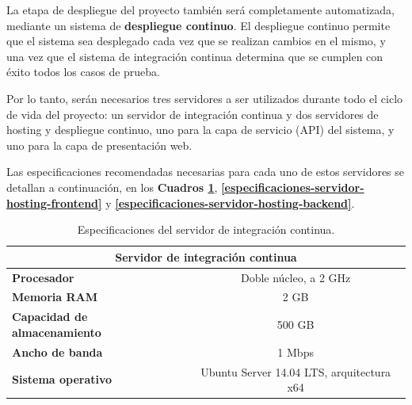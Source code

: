    La etapa de despliegue del proyecto también será completamente automatizada, mediante un sistema de \textbf{despliegue continuo}.
    El despliegue continuo permite que el sistema sea desplegado cada vez que se realizan cambios en el mismo, y una vez que el sistema de integración continua determina que se cumplen con éxito todos los casos de prueba.
    
    Por lo tanto, serán necesarios tres servidores a ser utilizados durante todo el ciclo de vida del proyecto: un servidor de integración continua y dos servidores de hosting y despliegue continuo, uno para la capa de servicio (API) del sistema, y uno para la capa de presentación web.
    
    Las especificaciones recomendadas necesarias para cada uno de estos servidores se detallan a continuación, en los \textbf{Cuadros \ref{especificaciones-servidor-integracion-continua}}, \textbf{\ref{especificaciones-servidor-hosting-frontend}} y \textbf{\ref{especificaciones-servidor-hosting-backend}}.
    
    \begin{table}[h]
        \centering
        \begin{tabular}{|l|c|}
            \hline
            \multicolumn{2}{|c|}{{\bf Servidor de integración continua}}                  \\ \hline
            {\bf Procesador}                  & Doble núcleo, a 2 GHz                     \\ \hline
            {\bf Memoria RAM}                 & 2 GB                                      \\ \hline
            {\bf Capacidad de almacenamiento} & 500 GB                                    \\ \hline
            {\bf Ancho de banda}              & 1 Mbps                                    \\ \hline
            {\bf Sistema operativo}           & Ubuntu Server 14.04 LTS, arquitectura x64 \\ \hline
        \end{tabular}
        \caption{Especificaciones del servidor de integración continua.}
        \label{especificaciones-servidor-integracion-continua}
    \end{table}
    

